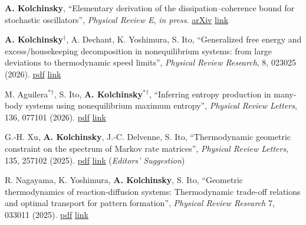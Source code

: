 
\newcommand{\pdflink}[1]{\href{https://artemyk.github.io/assets/pdf/papers/#1.pdf}{pdf}}
\newcommand{\publink}[1]{\href{#1}{link}}
\newcommand{\CA}{$^\dagger$}


\newcommand\pubhead[1]{{\fontsize{11.5}{0}\selectfont{\textbf{#1}}}}

\pubhead{Nonequilibrium thermodynamics}

\textbf{A. Kolchinsky}, ``Elementary derivation of the dissipation--coherence bound for stochastic oscillators'', \emph{Physical Review E}, \emph{in press}. \href{https://arxiv.org/abs/2510.14101}{arXiv} \publink{https://doi.org/10.1103/yj2t-frgz}

\textbf{A. Kolchinsky}\CA, A. Dechant, K. Yoshimura, S. Ito, ``Generalized free energy and excess/housekeeping decomposition in nonequilibrium systems: from large deviations to thermodynamic speed limits'', \emph{Physical Review Research}, 8, 023025 (2026). \pdflink{Kolchinsky-et-al-GeneralizedFreeEnergy-2026} \publink{https://doi.org/10.1103/r48t-dghl}

M. Aguilera$^*$\CA, S. Ito, \textbf{A. Kolchinsky}$^*$\CA, ``Inferring entropy production in many-body systems using nonequilibrium maximum entropy'', \emph{Physical Review Letters}, 136, 077101 (2026). \pdflink{AguileraItoKolchinsky_InferringEntropyProduction_PRL_2026} \publink{https://journals.aps.org/prl/abstract/10.1103/xgkj-dxzh}

G.-H. Xu, \textbf{A. Kolchinsky}, J.-C. Delvenne, S. Ito, ``Thermodynamic geometric constraint on the spectrum of Markov rate matrices'', \emph{Physical Review Letters}, 135, 257102 (2025). \pdflink{Xu_et_al-ThermodynamicGeometricConstraintOnTheSpectrum} \publink{https://journals.aps.org/prl/abstract/10.1103/z4t2-18cx} (\emph{Editors' Suggestion})%

R. Nagayama, K. Yoshimura, \textbf{A. Kolchinsky}, S. Ito, ``Geometric thermodynamics of reaction-diffusion systems: Thermodynamic trade-off relations and optimal transport for pattern formation'', \emph{Physical Review Research} 7, 033011 (2025). \pdflink{Nagayama_GeometricThermodynamicsOfReactionDiffusion} \publink{https://journals.aps.org/prresearch/abstract/10.1103/PhysRevResearch.7.033011} %

